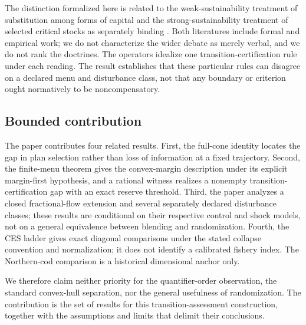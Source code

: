 The distinction formalized here is related to the weak-sustainability treatment of substitution among forms of capital and the strong-sustainability treatment of selected critical stocks as separately binding \citep{PearceAtkinson1993,Beckerman1994,Daly1995,Ayres2001,Neumayer2013,DietzNeumayer2007}. Both literatures include formal and empirical work; we do not characterize the wider debate as merely verbal, and we do not rank the doctrines. The operators idealize one transition-certification rule under each reading. The result establishes that these particular rules can disagree on a declared menu and disturbance class, not that any boundary or criterion ought normatively to be noncompensatory.

\subsection{Bounded contribution}

The paper contributes four related results. First, the full-cone identity locates the gap in plan selection rather than loss of information at a fixed trajectory. Second, the finite-menu theorem gives the convex-margin description under its explicit margin-first hypothesis, and a rational witness realizes a nonempty transition-certification gap with an exact reserve threshold. Third, the paper analyzes a closed fractional-flow extension and several separately declared disturbance classes; these results are conditional on their respective control and shock models, not on a general equivalence between blending and randomization. Fourth, the CES ladder gives exact diagonal comparisons under the stated collapse convention and normalization; it does not identify a calibrated fishery index. The Northern-cod comparison is a historical dimensional anchor only.

We therefore claim neither priority for the quantifier-order observation, the standard convex-hull separation, nor the general usefulness of randomization. The contribution is the set of results for this transition-assessment construction, together with the assumptions and limits that delimit their conclusions.
